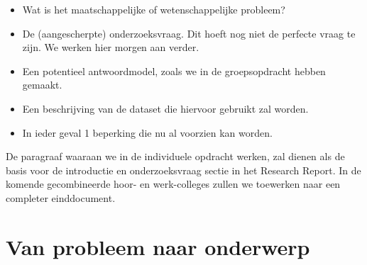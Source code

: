 \documentclass[
  letterpaper,
  DIV=11,
  numbers=noendperiod]{scrreprt}
\providecommand{\tightlist}{%
  \setlength{\itemsep}{0pt}\setlength{\parskip}{0pt}}
\begin{document}
\begin{itemize}
\tightlist
\item
  Wat is het maatschappelijke of wetenschappelijke probleem?
\item
  De (aangescherpte) onderzoeksvraag. Dit hoeft nog niet de perfecte
  vraag te zijn. We werken hier morgen aan verder.
\item
  Een potentieel antwoordmodel, zoals we in de groepsopdracht hebben
  gemaakt.
\item
  Een beschrijving van de dataset die hiervoor gebruikt zal worden.
\item
  In ieder geval 1 beperking die nu al voorzien kan worden.
\end{itemize}

De paragraaf waaraan we in de individuele opdracht werken, zal dienen
als de basis voor de introductie en onderzoeksvraag sectie in het
Research Report. In de komende gecombineerde hoor- en werk-colleges
zullen we toewerken naar een completer einddocument.


\chapter{Van probleem naar onderwerp}\label{sec-mt2}
\end{document}
